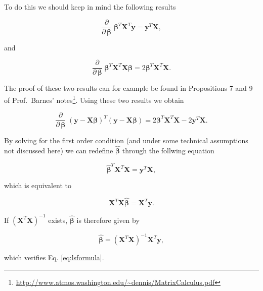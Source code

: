 \documentclass[12pt,]{krantz}
\renewcommand{\href}[2]{#2\footnote{\url{#1}}}
\begin{document}
To do this we should keep in mind the following results

\begin{equation*}
  \frac{\partial}{\partial \, \boldsymbol{\beta}} \; \boldsymbol{\beta}^T \mathbf{X}^T\mathbf{y} =   
  \mathbf{y}^T \mathbf{X},
\end{equation*}

and

\begin{equation*}
  \frac{\partial}{\partial \, \boldsymbol{\beta}} \; \boldsymbol{\beta}^T \mathbf{X}^T \mathbf{X} \boldsymbol{\beta} =  2 \boldsymbol{\beta}^T \mathbf{X}^T \mathbf{X}.
\end{equation*}

The proof of these two results can for example be found in Propositions
7 and 9 of
\href{http://www.atmos.washington.edu/~dennis/MatrixCalculus.pdf}{Prof.~Barnes'
notes}. Using these two results we obtain

\begin{equation*}
  \frac{\partial}{\partial \, \boldsymbol{\beta}} \; \left( \mathbf{y} - \mathbf{X}\boldsymbol{\beta} \right)^T \left( \mathbf{y} - \mathbf{X} \boldsymbol{\beta} \right) = 2 \boldsymbol{\beta}^T \mathbf{X}^T \mathbf{X} - 2\mathbf{y}^T \mathbf{X}.
\end{equation*}

By solving for the first order condition (and under some technical
assumptions not discussed here) we can redefine
\(\hat{\boldsymbol{\beta}}\) through the follwing equation

\begin{equation*}
  \hat{\boldsymbol{\beta}}^T \mathbf{X}^T \mathbf{X} = \mathbf{y}^T \mathbf{X},
\end{equation*}

which is equivalent to

\begin{equation*}
  \mathbf{X}^T \mathbf{X} \hat{\boldsymbol{\beta}} =   \mathbf{X}^T\mathbf{y}.
\end{equation*}

If \(\left(\mathbf{X}^T \mathbf{X}\right)^{-1}\) exists,
\(\hat{\boldsymbol{\beta}}\) is therefore given by

\begin{equation*}
  \hat{\boldsymbol{\beta}} = \left(\mathbf{X}^T \mathbf{X}\right)^{-1} \mathbf{X}^T \mathbf{y},
\end{equation*}

which verifies Eq. \eqref{eq:lsformula}.
\end{document}
